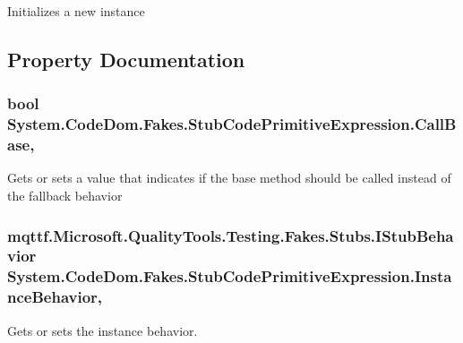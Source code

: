 Initializes a new instance



\subsection{Property Documentation}
\hypertarget{class_system_1_1_code_dom_1_1_fakes_1_1_stub_code_primitive_expression_a62c565e3e15cb6aa5905fe78ad0a72a3}{
\subsubsection[{Call\-Base}]{\setlength{\rightskip}{0pt plus 5cm}bool System.\-Code\-Dom.\-Fakes.\-Stub\-Code\-Primitive\-Expression.\-Call\-Base\hspace{0.3cm}{\ttfamily [get]}, {\ttfamily [set]}}}\label{class_system_1_1_code_dom_1_1_fakes_1_1_stub_code_primitive_expression_a62c565e3e15cb6aa5905fe78ad0a72a3}


Gets or sets a value that indicates if the base method should be called instead of the fallback behavior

\hypertarget{class_system_1_1_code_dom_1_1_fakes_1_1_stub_code_primitive_expression_a9656d5203bdff085b9db3bba00088df0}{
\subsubsection[{Instance\-Behavior}]{\setlength{\rightskip}{0pt plus 5cm}mqttf.\-Microsoft.\-Quality\-Tools.\-Testing.\-Fakes.\-Stubs.\-I\-Stub\-Behavior System.\-Code\-Dom.\-Fakes.\-Stub\-Code\-Primitive\-Expression.\-Instance\-Behavior\hspace{0.3cm}{\ttfamily [get]}, {\ttfamily [set]}}}\label{class_system_1_1_code_dom_1_1_fakes_1_1_stub_code_primitive_expression_a9656d5203bdff085b9db3bba00088df0}


Gets or sets the instance behavior.


